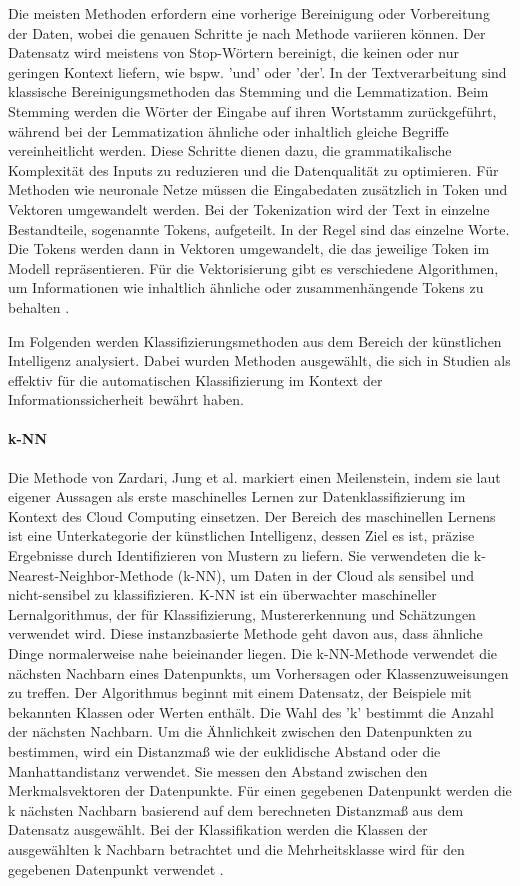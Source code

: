 Die meisten Methoden erfordern eine vorherige Bereinigung oder Vorbereitung der Daten, wobei die genauen Schritte je nach Methode variieren können. Der Datensatz wird meistens von Stop-Wörtern bereinigt, die keinen oder nur geringen Kontext liefern, wie bspw. 'und' oder 'der'. In der Textverarbeitung sind klassische Bereinigungsmethoden das Stemming und die Lemmatization. Beim Stemming werden die Wörter der Eingabe auf ihren Wortstamm zurückgeführt, während bei der Lemmatization ähnliche oder inhaltlich gleiche Begriffe vereinheitlicht werden.
Diese Schritte dienen dazu, die grammatikalische Komplexität des Inputs zu reduzieren und die Datenqualität zu optimieren. Für Methoden wie neuronale Netze müssen die Eingabedaten zusätzlich in Token und Vektoren umgewandelt werden. Bei der Tokenization wird der Text in einzelne Bestandteile, sogenannte Tokens, aufgeteilt. In der Regel sind das einzelne Worte. Die Tokens werden dann in Vektoren umgewandelt, die das jeweilige Token im Modell repräsentieren. Für die Vektorisierung gibt es verschiedene Algorithmen, um Informationen wie inhaltlich ähnliche oder zusammenhängende Tokens zu behalten \cite{Kamath.2019}.

Im Folgenden werden Klassifizierungsmethoden aus dem Bereich der künstlichen Intelligenz analysiert. Dabei wurden Methoden ausgewählt, die sich in Studien als effektiv für die automatischen Klassifizierung im Kontext der Informationssicherheit bewährt haben.


\paragraph{k-NN}
Die Methode von Zardari, Jung et al. \cite{Zardari.2014} markiert einen Meilenstein, indem sie laut eigener Aussagen als erste maschinelles Lernen zur Datenklassifizierung im Kontext des Cloud Computing einsetzen. Der Bereich des maschinellen Lernens ist eine Unterkategorie der künstlichen Intelligenz, dessen Ziel es ist, präzise Ergebnisse durch Identifizieren von Mustern zu liefern. Sie verwendeten die k-Nearest-Neighbor-Methode (k-NN), um Daten in der Cloud als sensibel und nicht-sensibel zu klassifizieren. K-NN ist ein überwachter maschineller Lernalgorithmus, der für Klassifizierung, Mustererkennung und Schätzungen verwendet wird. Diese instanzbasierte Methode geht davon aus, dass ähnliche Dinge normalerweise nahe beieinander liegen. Die k-NN-Methode verwendet die nächsten Nachbarn eines Datenpunkts, um Vorhersagen oder Klassenzuweisungen zu treffen. Der Algorithmus beginnt mit einem Datensatz, der Beispiele mit bekannten Klassen oder Werten enthält. Die Wahl des 'k' bestimmt die Anzahl der nächsten Nachbarn. Um die Ähnlichkeit zwischen den Datenpunkten zu bestimmen, wird ein Distanzmaß wie der euklidische Abstand oder die Manhattandistanz verwendet. Sie messen den Abstand zwischen den Merkmalsvektoren der Datenpunkte. Für einen gegebenen Datenpunkt werden die k nächsten Nachbarn basierend auf dem berechneten Distanzmaß aus dem Datensatz ausgewählt. Bei der Klassifikation werden die Klassen der ausgewählten k Nachbarn betrachtet und die Mehrheitsklasse wird für den gegebenen Datenpunkt verwendet \cite{Frochte.2018b}.

